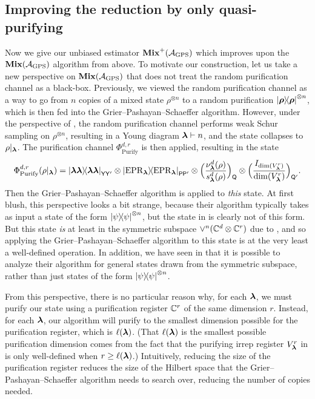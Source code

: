 \documentclass{article}
\newcommand{\mixed}{\textup{\textbf{Mix}}}
\newcommand{\purifychan}{\Phi_{\mathrm{Purify}}}
\newcommand{\reg}[1]{\mathsf{#1}}
\begin{document}
\subsection{Improving the reduction by only quasi-purifying}\label{sec:gps-mixed-llambda}

Now we give our unbiased estimator $\mixed^+(\calA_{\mathrm{GPS}})$ which improves upon the $\mixed(\calA_{\mathrm{GPS}})$ algorithm from  above.
To motivate our construction, let us take a new perspective on $\mixed(\calA_{\mathrm{GPS}})$ that does not treat the random purification channel as a black-box.
Previously, we viewed the random purification channel as a way to go from $n$ copies of a mixed state $\rho^{\otimes n}$ to a random purification $\ketbra{\boldsymbol{\rho}}^{\otimes n}$, which is then fed into the Grier--Pashayan--Schaeffer algorithm.
However, under the perspective of , the random purification channel performs weak Schur sampling on $\rho^{\otimes n}$, resulting in a Young diagram $\boldsymbol{\lambda} \vdash n$, and the state collapses to $\rho|_{\boldsymbol{\lambda}}$.
The purification channel $\purifychan^{d,r}$ is then applied, resulting in the state 
\begin{equation}\label{eq:surprise!-in-pi-sym}
    \purifychan^{d, r}(\rho|_{\blambda})
    = \ketbra{\blambda\blambda}{\blambda\blambda}_{\reg{Y} \reg{Y'}} \otimes \ketbra{\epr_{\blambda}}_{\reg{P} \reg{P'}} \otimes \Big(\frac{\nu^d_{\blambda}(\rho)}{s^d_{\blambda}(\rho)}\Big)_{\reg{Q}}  \otimes \Big(\frac{I_{\dim(V_{\blambda}^r)}}{\dim(V_{\blambda}^r)}\Big)_{\reg{Q'}}.
\end{equation}
Then the Grier--Pashayan--Schaeffer algorithm is applied to \emph{this} state. 
At first blush, this perspective looks a bit strange, because their algorithm typically takes as input a state of the form $\ketbra{\psi}^{\otimes n}$,
but the state in  is clearly not of this form.
But this state \emph{is} at least in the symmetric subspace $\lor^n (\mathbb C^d \otimes \mathbb C^r)$ due to ,
and so applying the Grier--Pashayan--Schaeffer algorithm to this state is at the very least a well-defined operation.
In addition, we have seen in  that it is possible to analyze their algorithm for general states drawn from the symmetric subspace, rather than just states of the form $\ketbra{\psi}^{\otimes n}$.

From this perspective, there is no particular reason why, for each $\boldsymbol{\lambda}$, we must purify our state using a purification register $\mathbb C^r$ of the same dimension $r$.
Instead, for each $\boldsymbol{\lambda}$, our algorithm will purify to the smallest dimension possible for the purification register, which is $\ell(\boldsymbol{\lambda})$.
(That $\ell(\boldsymbol{\lambda})$ is the smallest possible purification dimension comes from the fact that the purifying irrep register $V_{\boldsymbol{\lambda}}^r$ in  is only well-defined when $r \geq \ell(\boldsymbol{\lambda})$.)
Intuitively, reducing the size of the purification register
reduces the size of the Hilbert space that the Grier--Pashayan--Schaeffer algorithm needs to search over,
reducing the number of copies needed.
\end{document}
